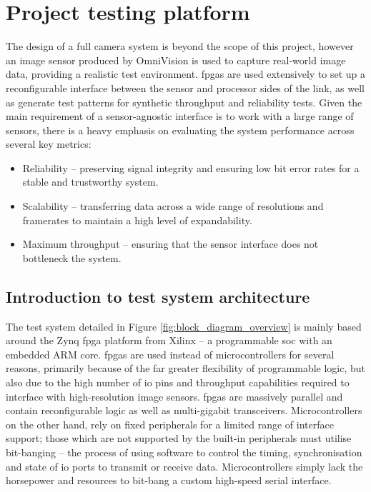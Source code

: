 \documentclass[a4paper]{report}
\begin{document}
\section{Project testing platform}

The design of a full camera system is beyond the scope of this project, however an image sensor produced by OmniVision is used to capture real-world image data, providing a realistic test environment. \Glspl{fpga} are used extensively to set up a reconfigurable interface between the sensor and processor sides of the link, as well as generate test patterns for synthetic throughput and reliability tests. Given the main requirement of a sensor-agnostic interface is to work with a large range of sensors, there is a heavy emphasis on evaluating the system performance across several key metrics:

\begin{itemize}
  \item Reliability -- preserving signal integrity and ensuring low bit error rates for a stable and trustworthy system.
  \item Scalability -- transferring data across a wide range of resolutions and framerates to maintain a high level of expandability.
  \item Maximum throughput -- ensuring that the sensor interface does not bottleneck the system.
\end{itemize}

\subsection{Introduction to test system architecture}

The test system detailed in Figure \ref{fig:block_diagram_overview} is mainly based around the Zynq \gls{fpga} platform from Xilinx -- a programmable \gls{soc} with an embedded ARM core. \Glspl{fpga} are used instead of microcontrollers for several reasons, primarily because of the far greater flexibility of programmable logic, but also due to the high number of \gls{io} pins and throughput capabilities required to interface with high-resolution image sensors. \Glspl{fpga} are massively parallel and contain reconfigurable logic as well as multi-gigabit transceivers. Microcontrollers on the other hand, rely on fixed peripherals for a limited range of interface support; those which are not supported by the built-in peripherals must utilise bit-banging -- the process of using software to control the timing, synchronisation and state of \gls{io} ports to transmit or receive data. Microcontrollers simply lack the horsepower and resources to bit-bang a custom high-speed serial interface.
\end{document}
